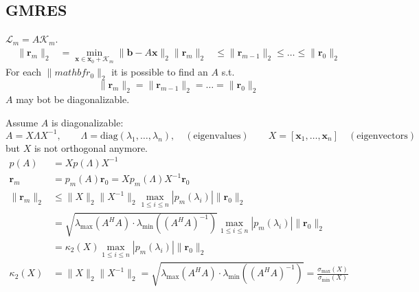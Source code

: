 \subsection{GMRES}
$\mathcal{L}_m = A\mathcal{K}_m$.
\begin{align*}
    \|\mathbf{r}_m\|_2 & = \min_{\mathbf{x} \in \mathbf{x}_0 + \mathcal{K}_m} \|\mathbf{b} - A\mathbf{x}\|_2
    \|\mathbf{r}_m\|_2 & \leq \|\mathbf{r}_{m-1}\|_2 \leq \ldots \leq \|\mathbf{r}_0\|_2
\end{align*}
For each $\|mathbf{r}_0\|_2$ it is possible to find an $A$ s.t.
\[
    \|\mathbf{r}_m\|_2 = \|\mathbf{r}_{m-1}\|_2 = \ldots = \|\mathbf{r}_0\|_2
\]
$A$ may bot be diagonalizable.

Assume $A$ is diagonalizable:
\[
    A = X\Lambda X^{-1}, \qquad \Lambda = \text{diag}(\lambda_1, \ldots, \lambda_n), \quad (\text{eigenvalues})
    \qquad X = [\mathbf{x}_1, \ldots, \mathbf{x}_n] \quad (\text{eigenvectors})
\]
but $X$ is not orthogonal anymore.
\begin{align*}
    p(A)               & = Xp(\Lambda)X^{-1}                                                                                                                 \\
    \mathbf{r}_m       & = p_m(A)\mathbf{r}_0 = Xp_m(\Lambda)X^{-1}\mathbf{r}_0                                                                              \\
    \|\mathbf{r}_m\|_2 & \leq \|X\|_2 \|X^{-1}\|_2 \max_{1 \leq i \leq n} |p_m(\lambda_i)| \|\mathbf{r}_0\|_2                                                \\
                       & = \sqrt{\lambda_{\max}(A^H A) \cdot \lambda_{\min}((A^H A)^{-1})} \max_{1 \leq i \leq n} |p_m(\lambda_i)| \|\mathbf{r}_0\|_2        \\
                       & = \kappa_2(X) \max_{1 \leq i \leq n} |p_m(\lambda_i)| \|\mathbf{r}_0\|_2                                                            \\
    \kappa_2(X)        & = \|X\|_2 \|X^{-1}\|_2 = \sqrt{\lambda_{\max}(A^H A)\cdot \lambda_{\min}((A^H A)^{-1})} = \frac{\sigma_{\max}(X)}{\sigma_{\min}(X)}
\end{align*}
